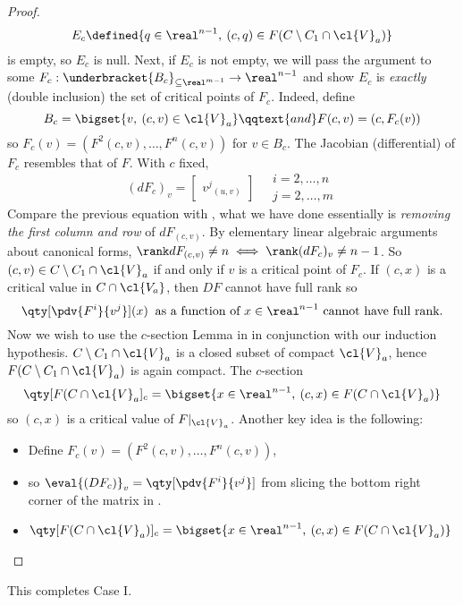 \documentclass[../main-v2-manifolds.tex]{subfiles}
\begin{document}
\begin{proof}
    \[
    E_c \defined \{q\in \real^{n-1},\: (c,q)\in F(C\setminus C_1\cap \cl{V}_a)\}
    \]
    is empty, so $E_c$ is null. Next, if $E_c$ is not empty, we will pass the argument to some $F_c: \underbracket{B_c}_{\subseteq \real^{m-1}}\to \real^{n-1}$ and show $E_c$ is \emph{exactly} (double inclusion) the set of critical points of $F_c$. Indeed, define
    \[
        B_c = \bigset{v,\: (c,v)\in\cl{V}_a}\qqtext{and}F(c,v)=(c,F_c(v))
    \]
    so $F_c(v) = (F^2(c,v),\ldots,F^{n}(c,v))$ for $v\in B_c$. The Jacobian (differential) of $F_c$ resembles that of $F$. With $c$ fixed,
    \[
        (dF_c)_v = \begin{bmatrix}
            {v^j}_{(u,v)}
        \end{bmatrix}\quad \substack{i=2,\ldots,n\\ j=2,\ldots,m}
    \]
    Compare the previous equation with , what we have done essentially is \emph{removing the first column and row} of $dF_{(c,v)}$. By elementary linear algebraic arguments about canonical forms, $\rank dF_{(c,v)}\neq n\iff \rank (dF_c)_v\neq n-1$. So $(c,v)\in C\setminus C_1\cap \cl{V}_a$ if and only if $v$ is a critical point of $F_c$.  If $(c,x)$ is a critical value in $C\cap \cl{V_a}$, then $DF$ cannot have full rank so 
    \[
        \qty[\pdv{F^i}{v^j}](x)\:\text{ as a function of }x\in\real^{n-1}\text{ cannot have full rank.}
    \]
    Now we wish to use the $c$-section Lemma in  in conjunction with our induction hypothesis. $C\setminus C_1\cap \cl{V}_a$ is a closed subset of compact $\cl{V}_a$, hence $F(C\setminus C_1\cap \cl{V}_a)$ is again compact. The $c$-section
    \[
        \qty[F(C\cap \cl{V}_a]_c = \bigset{x\in\real^{n-1},\: (c,x)\in F(C\cap\cl{V}_a)}
    \]
    so $(c,x)$ is a critical value of $F|_{\cl{V}_a}$. Another key idea is the following:
    \begin{itemize}
        \item Define $F_c(v) = (F^2(c,v),\ldots, F^n(c,v))$, 
        \item so $\eval{(DF_c)}_{v} = \qty[\pdv{F^i}{v^j}]$ from slicing the bottom right corner of the matrix in .
        \item $\qty[F(C\cap \cl{V}_a)]_c = \bigset{x\in\real^{n-1},\: (c,x)\in F(C\cap \cl{V}_a)}$ 
    \end{itemize}
    
\end{proof}
This completes Case I. 






\end{document}
